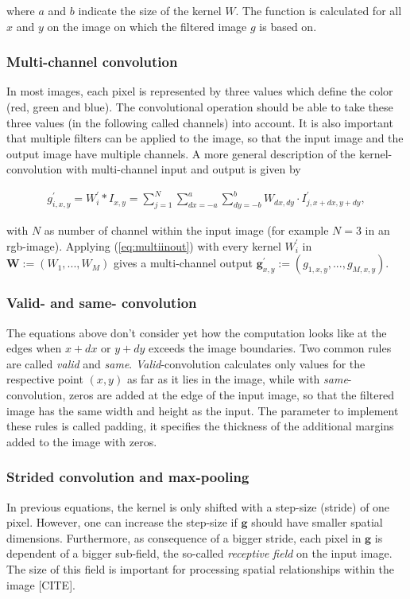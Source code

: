 where $a$ and $b$ indicate the size of the kernel $W$. The function is calculated for all $x$ and $y$ on the image on which the filtered image $g$ is based on. 

\subsubsection{Multi-channel convolution} \label{cap:multichannel}
In most images, each pixel is represented by three values which define the color (red, green and blue). The convolutional operation should be able to take these three values (in the following called channels) into account. It is also important that multiple filters can be applied to the image, so that the input image and the output image have multiple channels. A more general description of the kernel-convolution with multi-channel input and output is given by

\begin{align}
    g_{i,x,y}^{\prime}= W_i^{\prime}*I_{x,y}=\sum_{j=1}^N\sum_{dx=-a}^a{\sum_{dy=-b}^b{W_{dx,dy}\cdot I_{j,x+dx,y+dy}^{\prime}}},
    \label{eq:multiinout}
\end{align}

with $N$ as number of channel within the input image (for example $N=3$ in an rgb-image).
Applying (\ref{eq:multiinout}) with every kernel $W_i^{\prime}$ in $\textbf{W}:=(W_1,...,W_M)$ gives a multi-channel output $\textbf{g}_{x,y}^{\prime}:=(g_{1,x,y},...,g_{M,x,y})$. 

\subsubsection{Valid- and same- convolution}
The equations above don't consider yet how the computation looks like at the edges when $x+dx$ or $y+dy$ exceeds the image boundaries. Two common rules are called \textit{valid} and \textit{same}. \textit{Valid}-convolution calculates only values for the respective point $(x,y)$ as far as it lies in the image, while with \textit{same}-convolution, zeros are added at the edge of the input image, so that the filtered image has the same width and height as the input. The parameter to implement these rules is called padding, it specifies the thickness of the additional margins added to the image with zeros.

\subsubsection{Strided convolution and max-pooling}
In previous equations, the kernel is only shifted with a step-size (stride) of one pixel. However, one can increase the step-size if $\textbf{g}$ should have smaller spatial dimensions. Furthermore, as consequence of a bigger stride, each pixel in $\textbf{g}$ is dependent of a bigger sub-field, the so-called \textit{receptive field} on the input image. The size of this field is important for processing spatial relationships within the image [CITE].

